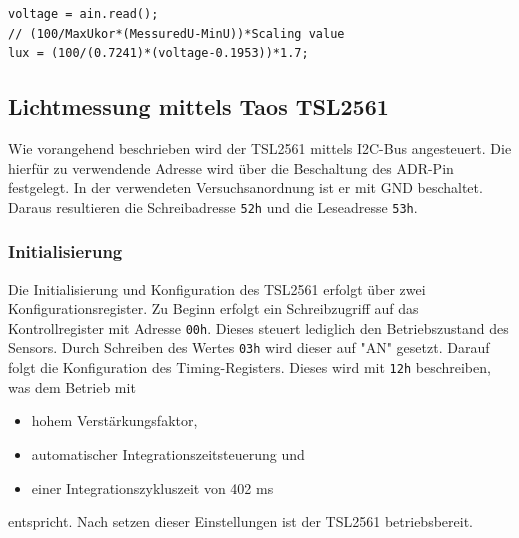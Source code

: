 \documentclass[a4paper,12pt]{scrartcl}
\begin{document}

\begin{lstlisting}[captionpos=b, caption=Berechnung der Beleuchtungsstärke mit dem GSLx, label=code:GSLx]
voltage = ain.read();
// (100/MaxUkor*(MessuredU-MinU))*Scaling value
lux = (100/(0.7241)*(voltage-0.1953))*1.7;
\end{lstlisting}

\subsection{Lichtmessung mittels Taos TSL2561}
\label{sec:impTaos}
Wie vorangehend beschrieben wird der TSL2561 mittels I2C-Bus angesteuert. Die hierfür zu verwendende Adresse wird über die Beschaltung des ADR-Pin festgelegt. In der verwendeten Versuchsanordnung ist er mit GND beschaltet. Daraus resultieren die Schreibadresse \texttt{52h} und die Leseadresse \texttt{53h}.
\subsubsection{Initialisierung}
Die Initialisierung und Konfiguration des TSL2561 erfolgt über zwei Konfigurationsregister. Zu Beginn erfolgt ein Schreibzugriff auf das Kontrollregister mit Adresse \texttt{00h}. Dieses steuert lediglich den Betriebszustand des Sensors. Durch Schreiben des Wertes \texttt{03h} wird dieser auf "AN" gesetzt. Darauf folgt die Konfiguration des Timing-Registers. Dieses wird mit \texttt{12h} beschreiben, was dem Betrieb mit
\begin{itemize}
\item hohem Verstärkungsfaktor,
\item automatischer Integrationszeitsteuerung und 
\item einer Integrationszykluszeit von 402 ms
\end{itemize}
entspricht. Nach setzen dieser Einstellungen ist der TSL2561 betriebsbereit.
\end{document}
